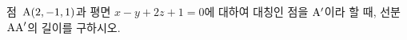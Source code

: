 점~$\mathrm{A}(2{,}\mkern3mu\mathopen{}-1{,}\mkern3mu\mathopen{}1)$과 평면 $x-y+2z+1=0$에 대하여 대칭인 점을 $\mathrm{A}'$이라 할 때, 선분~$\mathrm{AA}'$의 길이를 구하시오.
